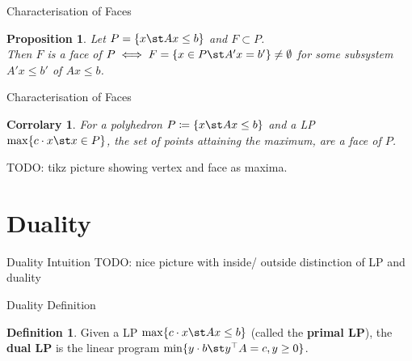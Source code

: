 \documentclass[a4paper, x11names, svgnames]{beamer}
\theoremstyle{definition}
\newtheorem*{defn}{Definition}
\theoremstyle{plain}
\newtheorem*{prop}{Proposition}
\theoremstyle{plain}
\newtheorem*{cor}{Corrolary}
\begin{document}
\begin{frame}{Characterisation of Faces}
    \begin{prop}
        Let $P=\{x\st Ax\leq b\}$ and $F \subset P$. \\
        Then $F$ is a face of $P \iff F=\{x\in P\st A'x=b'\}\neq\emptyset$ for some subsystem $A'x\leq b'$ of $Ax\leq b$.
    \end{prop}
    \center
\end{frame}

\begin{frame}{Characterisation of Faces}
    \begin{cor}
        For a polyhedron $P\coloneqq \{x\st Ax\leq b\}$ and a LP $\max\{c\cdot x\st x\in P\}$,
        the set of points attaining the maximum, are a face of $P$.
        \\
    \end{cor}
    TODO: tikz picture showing vertex and face as maxima.
\end{frame}


\section{Duality}
\begin{frame}{Duality Intuition}
    TODO: nice picture with inside/ outside distinction of LP and duality
\end{frame}

\begin{frame}{Duality Definition}
    \begin{defn}
        Given a LP $\max\{c\cdot x\st Ax\leq b\}$ (called the \textbf{primal LP}),
        the \textbf{dual LP} is the linear program $\min\{y\cdot b\st y^\top A =c, y\geq 0\}$.
    \end{defn}

\end{frame}
\end{document}
